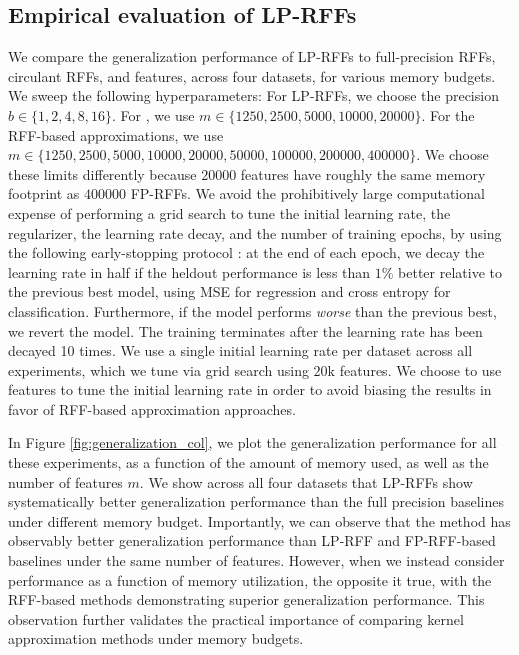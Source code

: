 \subsection{Empirical evaluation of LP-RFFs}
We compare the generalization performance of LP-RFFs to full-precision RFFs, circulant RFFs, and \Nystrom features, across four datasets, for various memory budgets.  We sweep the following hyperparameters: For LP-RFFs, we choose the precision $b \in \{1,2,4,8,16\}$. For \Nystrom, we use $m \in \{1250, 2500, 5000, 10000, 20000\}$.  For the RFF-based approximations, we use $m\in \{1250, 2500, 5000, 10000, 20000, 50000, 100000, 200000, 400000\}$.  We choose these limits differently because $\num[group-separator={,}]{20000}$ \Nystrom features have roughly the same memory footprint as $\num[group-separator={,}]{400000}$ FP-RFFs. We avoid the prohibitively large computational expense of performing a grid search to tune the initial learning rate, the regularizer, the learning rate decay, and the number of training epochs, by using the following early-stopping protocol \citep{zhang2005boosting,wei2017early}: at the end of each epoch, we decay the learning rate in half if the heldout performance is less than $1\%$ better relative to the previous best model, using MSE for regression and cross entropy for classification. Furthermore, if the model performs \textit{worse} than the previous best, we revert the model. The training terminates after the learning rate has been decayed 10 times. We use a single initial learning rate per dataset across all experiments, which we tune via grid search using $20\text{k}$ \Nystrom features. We choose to use \Nystrom features to tune the initial learning rate in order to avoid biasing the results in favor of RFF-based approximation approaches. 

In Figure \ref{fig:generalization_col}, we plot the generalization performance for all these experiments, as a function of the amount of memory used, as well as the number of features $m$. We show across all four datasets that LP-RFFs show systematically better generalization performance than the full precision baselines under different memory budget. Importantly, we can observe that the \Nystrom method has observably better generalization performance than LP-RFF and FP-RFF-based baselines under the same number of features. However, when we instead consider performance as a function of memory utilization, the opposite it true, with the RFF-based methods demonstrating superior generalization performance. This observation further validates the practical importance of comparing kernel approximation methods under memory budgets.

